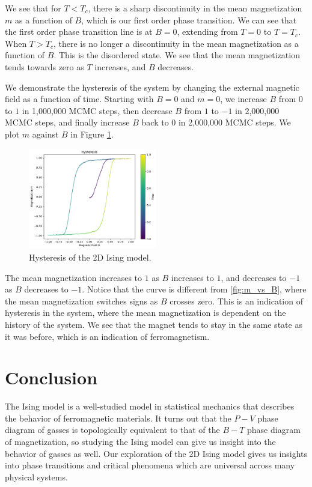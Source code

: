\documentclass[
 reprint,
 amsmath,
 amssymb,
 aps,
]{revtex4-2}
\begin{document}
We see that for $ T < T_{c} $,
there is a sharp discontinuity in the mean magnetization $ m $ 
as a function of $ B $, which is our first order phase transition.
We can see that the first order phase transition line is at $ B=0 $,
extending from $ T = 0 $ to $ T= T_{c} $.
When $ T > T_{c} $,
there is no longer a discontinuity in the mean magnetization 
as a function of $ B $.
This is the disordered state. 
We see that the mean magnetization tends towards zero as $ T $ increases,
and $ B $ decreases.

We demonstrate the hysteresis of the system by changing the external magnetic
field as a function of time.
Starting with $ B = 0 $ and $ m = 0 $,
we increase $ B $ from $ 0 $ to $ 1 $ in 1,000,000 MCMC steps,
then decrease $ B $ from $ 1 $ to $ -1 $ in 2,000,000 MCMC steps,
and finally increase $ B $ back to $ 0 $ in 2,000,000 MCMC steps.
We plot $ m $ against $ B $ in Figure \ref{fig:hysteresis}.
\begin{figure}[ht]
\centering
\includegraphics[width=0.5\textwidth]{figures/hysteresis.pdf}
\caption{Hysteresis of the 2D Ising model.}
\label{fig:hysteresis}
\end{figure}
The mean magnetization increases to $ 1 $ as $ B $ increases to $ 1 $,
and decreases to $ -1 $ as $ B $ decreases to $ -1 $.
Notice that the curve is different from \ref{fig:m_vs_B},
where the mean magnetization switches signs as $ B $ crosses zero.
This is an indication of hysteresis in the system,
where the mean magnetization is dependent on the history of the system.
We see that the magnet tends to stay in the same state as it was before,
which is an indication of ferromagnetism.



\section{Conclusion}
\label{sec:conclusion}
The Ising model is a well-studied model in statistical mechanics
that describes the behavior of ferromagnetic materials.
It turns out that the $ P-V $ phase diagram of gasses is topologically
equivalent to that of the $ B-T $ phase diagram of magnetization,
so studying the Ising model can give us insight into the behavior of gasses
as well.
Our exploration of the 2D Ising model gives us insights into phase
transitions and critical phenomena which are universal across many
physical systems.
\end{document}
